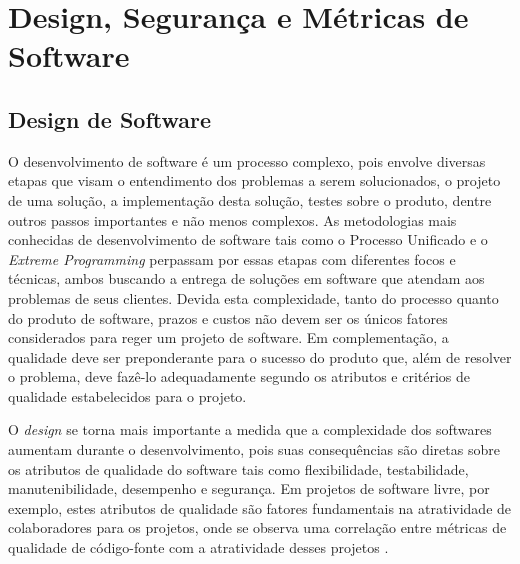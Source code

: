 \chapter{Design, Segurança e Métricas de Software}
\label{cap-metrics}

\section{Design de Software}
\label{sec-design-sw}

O desenvolvimento de software é um processo complexo, pois envolve diversas etapas que visam o entendimento dos problemas a serem solucionados, o projeto de uma solução, a implementação desta solução, testes sobre o produto, dentre outros passos importantes e não menos complexos. As metodologias mais conhecidas de desenvolvimento de software tais como o Processo Unificado e o \emph{Extreme Programming} perpassam por essas etapas com diferentes focos e técnicas, ambos buscando a entrega de soluções em software que atendam aos problemas de seus clientes. Devida esta complexidade, tanto do processo quanto do produto de software, prazos e custos não devem ser os únicos fatores considerados para reger um projeto de software. Em complementação, a qualidade deve ser preponderante para o sucesso do produto que, além de resolver o problema, deve fazê-lo adequadamente segundo os atributos e critérios de qualidade estabelecidos para o projeto.

%

O \emph{design} se torna mais importante a medida que a complexidade dos softwares aumentam durante o desenvolvimento, pois suas consequências são diretas sobre os atributos de qualidade do software tais como flexibilidade, testabilidade, manutenibilidade, desempenho e segurança. Em projetos de software livre, por exemplo, estes atributos de qualidade são fatores fundamentais na atratividade de colaboradores para os projetos, onde se observa uma correlação entre métricas de qualidade de código-fonte com a atratividade desses projetos \cite{meirelles2013metrics}. 

%

